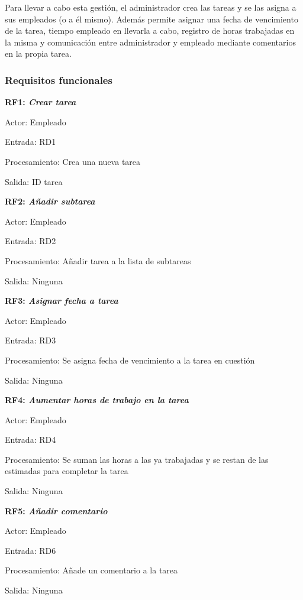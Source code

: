 \documentclass[paper=a4, fontsize=11pt, spanish]{scrartcl}
\begin{document}
	Para llevar a cabo esta gestión, el administrador crea las tareas y se las asigna a sus empleados (o a él mismo). Además permite asignar una fecha de vencimiento de la tarea, tiempo empleado en llevarla a cabo, registro de horas trabajadas en la misma y comunicación entre administrador y empleado mediante comentarios en la propia tarea.

\subsubsection{Requisitos funcionales}
\setlength{\parindent}{0em}
\textbf{RF1: \textit{Crear tarea}}
\setlength{\parindent}{2em}

Actor: Empleado

Entrada: RD1

Procesamiento: Crea una nueva tarea

Salida: ID tarea

\setlength{\parindent}{0em}
\textbf{RF2: \textit{Añadir subtarea}}
\setlength{\parindent}{2em}

Actor: Empleado

Entrada: RD2

Procesamiento: Añadir tarea a la lista de subtareas

Salida: Ninguna

\setlength{\parindent}{0em}
\textbf{RF3: \textit{Asignar fecha a tarea}}
\setlength{\parindent}{2em}

Actor: Empleado

Entrada: RD3

Procesamiento: Se asigna fecha de vencimiento a la tarea en cuestión

Salida: Ninguna

\setlength{\parindent}{0em}
\textbf{RF4: \textit{Aumentar horas de trabajo en la tarea}}
\setlength{\parindent}{2em}

Actor: Empleado

Entrada: RD4

Procesamiento: Se suman las horas a las ya trabajadas y se restan de las estimadas para completar la tarea

Salida: Ninguna

\setlength{\parindent}{0em}
\textbf{RF5: \textit{Añadir comentario}}
\setlength{\parindent}{2em}

Actor: Empleado

Entrada: RD6

Procesamiento: Añade un comentario a la tarea

Salida: Ninguna
\end{document}
